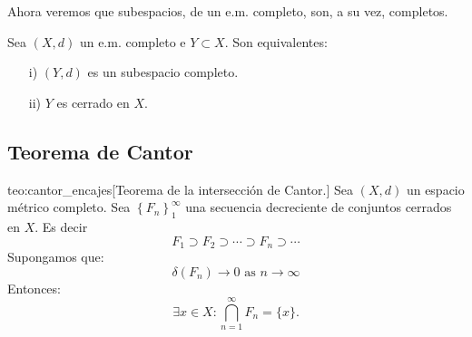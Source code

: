 Ahora veremos que subespacios, de un e.m. completo, son, a su vez,
completos.

\begin{proposicion}{} Sea $(X,d)$ un e.m. completo e $Y\subset X$.
Son equivalentes:
\begin{itemize}
\item[i)] $(Y,d)$ es un subespacio completo.
\item[ii)] $Y$ es cerrado en $X$.
\end{itemize}
\end{proposicion}

\subsection{Teorema de Cantor}



\begin{teorema}{teo:cantor_encajes}[Teorema de la intersección de Cantor.] Sea $(X, d)$ un espacio métrico completo. Sea $\left\{F_{n}\right\}_{1}^{\infty}$ una secuencia decreciente de conjuntos cerrados en $X$. Es decir
$$
F_{1} \supset F_{2} \supset\cdots \supset F_{n} \supset\cdots
$$
Supongamos  que:
$$
\delta\left(F_{n}\right) \longrightarrow 0 \text { as } n \rightarrow \infty
$$
Entonces:
$$
\exists x \in X: \bigcap_{n=1}^{\infty} F_{n}=\{x\} .
$$ 
\end{teorema}


